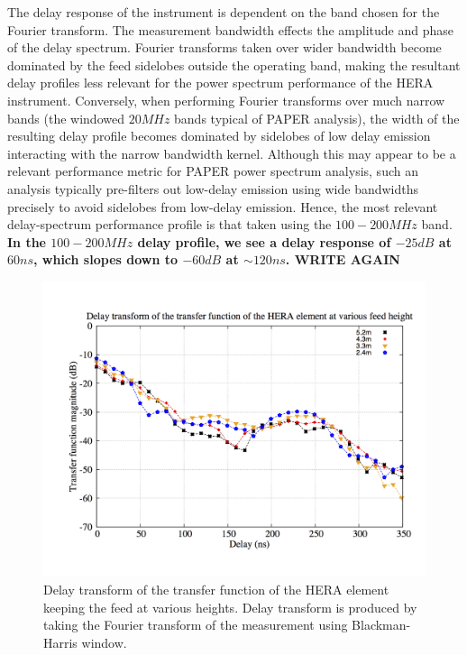 \documentclass[twocolumn]{emulateapj}
\begin{document}
The delay response of the instrument is dependent on the band chosen for the Fourier transform.
The measurement bandwidth effects the amplitude and phase of the delay spectrum. Fourier transforms taken over wider bandwidth
become dominated by the feed sidelobes outside the operating band, making the resultant delay profiles less relevant
for the power spectrum performance of the HERA instrument.  Conversely, when performing Fourier transforms over much 
narrow bands (the windowed $20MHz$ bands typical of PAPER analysis), the width of the resulting delay profile
becomes dominated by sidelobes of low delay emission interacting with the narrow bandwidth kernel.  
Although this may appear to be a relevant performance metric for PAPER power spectrum analysis, such an analysis typically pre-filters out low-delay emission using wide bandwidths precisely to avoid sidelobes from low-delay emission.  Hence, the most relevant delay-spectrum performance profile is that taken using the $100-200MHz$ band. \textbf{In the $100-200MHz$ delay profile, we see a delay response of $-25dB$ at $60ns$, which slopes down to $-60dB$ at $\sim120ns$.  WRITE AGAIN}
\begin{figure}
\centering
\includegraphics[width=\linewidth]{plots1/delayspectrum_height.png}
\caption{Delay transform of the transfer function of the HERA element keeping the feed at various heights. Delay transform is produced by taking the Fourier transform of the measurement using Blackman-Harris window.}
\label{fig:elevator}
\end{figure}
\end{document}
